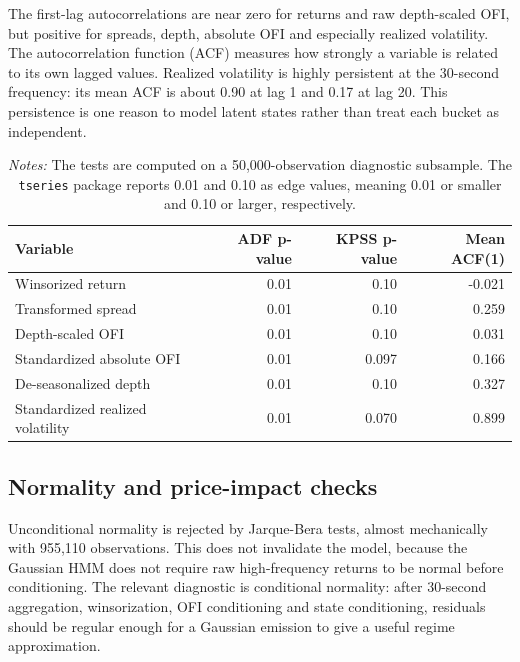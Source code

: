 \documentclass[12pt,a4paper]{article}
\begin{document}
The first-lag autocorrelations are near zero for returns and raw depth-scaled OFI, but positive for spreads, depth, absolute OFI  and especially realized volatility. The autocorrelation function (ACF) measures how strongly a variable is related to its own lagged values. Realized volatility is highly persistent at the 30-second frequency: its mean ACF is about 0.90 at lag 1 and 0.17 at lag 20. This persistence is one reason to model latent states rather than treat each bucket as independent.

\begin{table}[htbp]
\centering
\caption{Stationarity and persistence checks}
\small
\begin{tabular}{lrrr}
\toprule
\textbf{Variable} & \textbf{ADF p-value} & \textbf{KPSS p-value} & \textbf{Mean ACF(1)} \\
\midrule
Winsorized return & 0.01 & 0.10 & -0.021 \\
Transformed spread & 0.01 & 0.10 & 0.259 \\
Depth-scaled OFI & 0.01 & 0.10 & 0.031 \\
Standardized absolute OFI & 0.01 & 0.097 & 0.166 \\
De-seasonalized depth & 0.01 & 0.10 & 0.327 \\
Standardized realized volatility & 0.01 & 0.070 & 0.899 \\
\bottomrule
\end{tabular}
\caption*{\footnotesize\emph{Notes:} The tests are computed on a 50,000-observation diagnostic subsample. The \texttt{tseries} package reports 0.01 and 0.10 as edge values, meaning 0.01 or smaller and 0.10 or larger, respectively.}
\label{tab:stationarity}
\end{table}

\subsection{Normality and price-impact checks}\label{sec:normality_checks}

Unconditional normality is rejected by Jarque-Bera tests, almost mechanically with 955,110 observations. This does not invalidate the model, because the Gaussian HMM does not require raw high-frequency returns to be normal before conditioning. The relevant diagnostic is conditional normality: after 30-second aggregation, winsorization, OFI conditioning  and state conditioning, residuals should be regular enough for a Gaussian emission to give a useful regime approximation.
\end{document}
